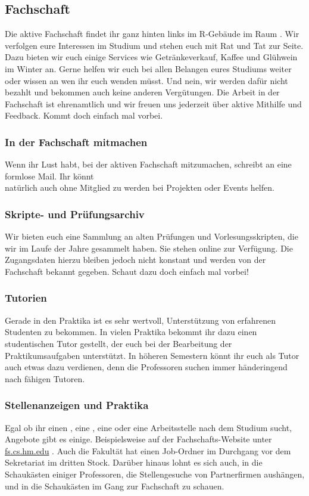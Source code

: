 \subsection{Fachschaft}
Die aktive Fachschaft findet ihr ganz hinten links im R-Gebäude im 
Raum . Wir verfolgen eure Interessen im Studium und stehen 
euch mit Rat und Tat zur Seite. Dazu bieten wir euch einige Services wie 
Getränkeverkauf, Kaffee und Glühwein im Winter an.\doublebreak
Gerne helfen wir euch bei allen Belangen eures 
Studiums weiter oder wissen an wen ihr euch wenden 
müsst. Und nein, wir werden dafür nicht bezahlt 
und bekommen auch keine anderen Vergütungen. 
Die Arbeit in der Fachschaft ist ehrenamtlich und wir 
freuen uns jederzeit über aktive Mithilfe und Feedback. 
Kommt doch einfach mal vorbei. 

\subsubsection{In der Fachschaft mitmachen}
Wenn ihr Lust habt, bei der aktiven Fachschaft mitzumachen, schreibt an  eine formlose Mail. Ihr könnt\\
natürlich auch ohne Mitglied zu werden bei Projekten oder Events helfen.

\subsubsection{Skripte- und Prüfungsarchiv}
Wir bieten euch eine Sammlung an alten Prüfungen und Vorlesungsskripten, die wir im Laufe der Jahre gesammelt haben. \doublebreak
Sie stehen online zur Verfügung. Die Zugangsdaten hierzu bleiben jedoch nicht konstant und werden von der Fachschaft bekannt
gegeben. Schaut dazu doch einfach mal vorbei!

\subsubsection{Tutorien}
Gerade in den Praktika ist es sehr wertvoll, Unterstützung von 
erfahrenen Studenten zu bekommen. In vielen Praktika bekommt ihr 
dazu einen studentischen Tutor gestellt, der euch bei der Bearbeitung 
der Praktikumsaufgaben unterstützt. \doublebreak
In höheren Semestern könnt ihr euch als Tutor auch etwas dazu 
verdienen, denn die Professoren suchen immer händeringend nach 
fähigen Tutoren. 

\subsubsection{Stellenanzeigen und Praktika}
Egal ob ihr einen , eine , 
eine  oder eine Arbeitsstelle nach dem 
Studium sucht, Angebote gibt es einige. Beispielsweise auf der 
Fachschafts-Website unter \url{fs.cs.hm.edu} \arrow {} \arrow {}. Auch die Fakultät hat einen Job-Ordner im Durchgang vor dem Sekretariat im dritten Stock. Darüber 
hinaus lohnt es sich auch, in die Schaukästen einiger Professoren, die Stellengesuche von Partnerfirmen aushängen, und in die Schaukästen im Gang zur Fachschaft zu schauen.

